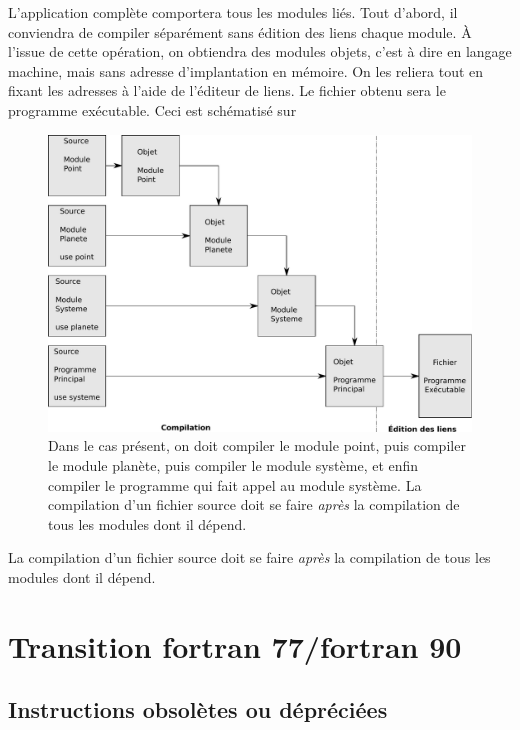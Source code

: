 \documentclass[a4paper,twoside]{article}
\begin{document}
L'application complète comportera tous les modules liés. Tout d'abord, il conviendra de compiler séparément sans édition des liens chaque module. À l'issue de cette opération, on obtiendra des modules objets, c'est à dire en langage machine, mais sans adresse d'implantation en mémoire. On les reliera tout en fixant les adresses à l'aide de l'éditeur de liens. Le fichier obtenu sera le programme exécutable. Ceci est schématisé sur 

\begin{figure}[htb]
\centering
\includegraphics[width=0.65\linewidth]{figure/compilation_modulaire.pdf}
\caption{Dans le cas présent, on doit compiler le module point, puis compiler le module planète, puis compiler le module système, et enfin compiler le programme qui fait appel au module système. La compilation d'un fichier source doit se faire \emph{après} la compilation de tous les modules dont il dépend.}\label{fig:compilation_modulaire}
\end{figure}

\begin{attention}
La compilation d'un fichier source doit se faire \emph{après} la compilation de tous les modules dont il dépend.
\end{attention}


\section{Transition fortran 77/fortran 90}
\subsection{Instructions obsolètes ou dépréciées}
\end{document}
